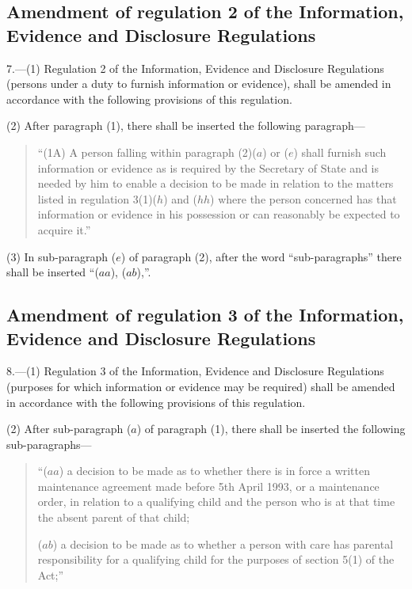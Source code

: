 \documentclass[a4paper]{article}
\begin{document}
\subsection[7. Amendment of regulation 2 of the Information, Evidence and Disclosure Regulations]{Amendment of regulation 2 of the Information, Evidence and Disclosure Regulations}

7.—(1) Regulation 2 of the Information, Evidence and Disclosure Regulations (persons under a duty to furnish information or evidence), shall be amended in accordance with the following provisions of this regulation.

(2) After paragraph (1), there shall be inserted the following paragraph—
\begin{quotation}
“(1A) A person falling within paragraph (2)($a$) or ($e$) shall furnish such information or evidence as is required by the Secretary of State and is needed by him to enable a decision to be made in relation to the matters listed in regulation 3(1)($h$) and ($hh$) where the person concerned has that information or evidence in his possession or can reasonably be expected to acquire it.”
\end{quotation}

(3) In sub-paragraph ($e$) of paragraph (2), after the word “sub-paragraphs” there shall be inserted “($aa$), ($ab$),”.

\subsection[8. Amendment of regulation 3 of the Information, Evidence and Disclosure Regulations]{Amendment of regulation 3 of the Information, Evidence and Disclosure Regulations}

8.—(1) Regulation 3 of the Information, Evidence and Disclosure Regulations (purposes for which information or evidence may be required) shall be amended in accordance with the following provisions of this regulation.

(2) After sub-paragraph ($a$) of paragraph (1), there shall be inserted the following sub-paragraphs—
\begin{quotation}
“($aa$) a decision to be made as to whether there is in force a written maintenance agreement made before 5th April 1993, or a maintenance order, in relation to a qualifying child and the person who is at that time the absent parent of that child;

($ab$) a decision to be made as to whether a person with care has parental responsibility for a qualifying child for the purposes of section 5(1) of the Act;”
\end{quotation}
\end{document}
